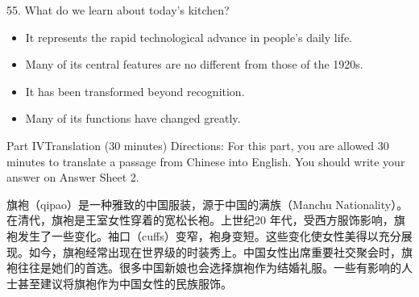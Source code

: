 \documentclass[UTF8,11pt]{ctexart}
\begin{document}
55. What do we learn about today’s kitchen?


\begin{itemize}[leftmargin=2em,itemsep=.2em,topsep=.4em]\item[A.] It represents the rapid technological advance in people’s daily life.
\item[B.] Many of its central features are no different from those of the 1920s.
\item[C.] It has been transformed beyond recognition.
\item[D.] Many of its functions have changed greatly.
\end{itemize}

Part IVTranslation (30 minutes) Directions: For this part, you are allowed 30 minutes to translate a passage from Chinese into English. You should write your answer on Answer Sheet 2.


旗袍（qipao）是一种雅致的中国服装，源于中国的满族（Manchu Nationality）。在清代，旗袍是王室女性穿着的宽松长袍。上世纪20 年代，受西方服饰影响，旗袍发生了一些变化。袖口（cuffs）变窄，袍身变短。这些变化使女性美得以充分展现。如今，旗袍经常出现在世界级的时装秀上。中国女性出席重要社交聚会时，旗袍往往是她们的首选。很多中国新娘也会选择旗袍作为结婚礼服。一些有影响的人士甚至建议将旗袍作为中国女性的民族服饰。
\end{document}
